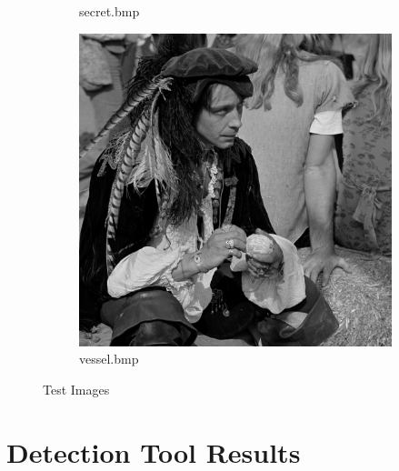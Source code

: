 \documentclass{l4proj}
\begin{document}
\begin{appendices}
\begin{figure}[!h]
\begin{subfigure}[b]{0.3\textwidth}
        \caption{secret.bmp}
        \label{secret.bmp}
    \end{subfigure}
    \begin{subfigure}[b]{0.3\textwidth}
        \includegraphics[width=\textwidth]{images/vessel.png}
        \caption{vessel.bmp}
        \label{vessel.bmp}
    \end{subfigure}
    \caption{Test Images}
    \label{fig:test_images}
\end{figure}

\newpage

\chapter{Detection Tool Results}


\end{appendices}
\end{document}
